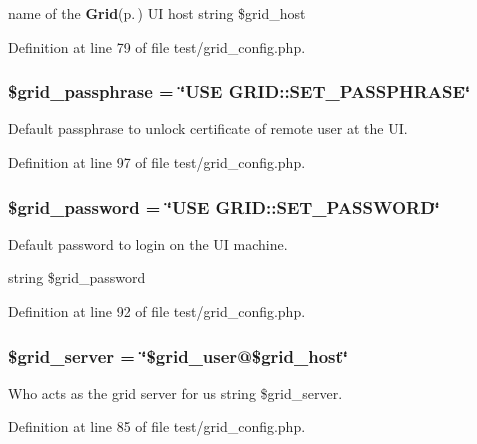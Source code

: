 name of the {\bf Grid}{\rm (p.\,\pageref{classGrid})} UI host  string \$grid\_\-host 



Definition at line 79 of file test/grid\_\-config.php.
\subsubsection{\setlength{\rightskip}{0pt plus 5cm}\$grid\_\-passphrase = \char`\"{}USE GRID::SET\_\-PASSPHRASE\char`\"{}}\label{test_2grid__config_8php_a7}


Default passphrase to unlock certificate of remote user at the UI. 



Definition at line 97 of file test/grid\_\-config.php.
\subsubsection{\setlength{\rightskip}{0pt plus 5cm}\$grid\_\-password = \char`\"{}USE GRID::SET\_\-PASSWORD\char`\"{}}\label{test_2grid__config_8php_a6}


Default password to login on the UI machine. 

string \$grid\_\-password 

Definition at line 92 of file test/grid\_\-config.php.
\subsubsection{\setlength{\rightskip}{0pt plus 5cm}\$grid\_\-server = \char`\"{}\$grid\_\-user@\$grid\_\-host\char`\"{}}\label{test_2grid__config_8php_a5}


Who acts as the grid server for us  string \$grid\_\-server. 



Definition at line 85 of file test/grid\_\-config.php.
